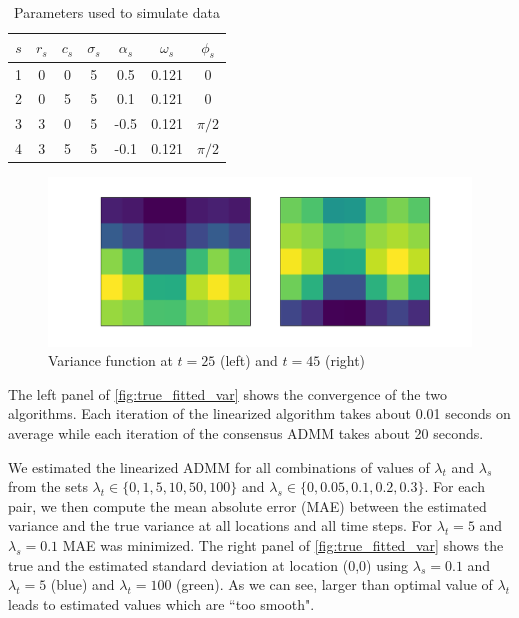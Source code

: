 \documentclass{article}
\begin{document}
\begin{table}[tb]
	\caption{Parameters used to simulate data}
	\label{tab:sim_params}
	\vskip 0.15in
	\begin{center}
		\begin{small}
			\begin{sc}
				\begin{tabular}{ccccccc}
					\hline

					$s$ & $r_s$ & $c_s$ & $\sigma_s$ &$\alpha_s$ & $\omega_s$ & $\phi_s$\\
					\hline
					1 & 0 & 0 & 5 & 0.5 & 0.121 & 0 \\
					2 & 0 & 5 & 5 & 0.1 & 0.121 & 0 \\
					3 & 3 & 0 & 5 & -0.5 & 0.121 & $\pi/2$ \\
					4 & 3 & 5 & 5 & -0.1 & 0.121 & $\pi/2$ \\
					\hline
				\end{tabular}
			\end{sc}
		\end{small}
	\end{center}
	\vskip -0.1in
\end{table} 

\begin{figure}[tb]
	\centering	
	\includegraphics[width=.7\linewidth]{Figures/true_var_spatial}		
	
	\caption{Variance function at $t=25$ (left) and $t=45$ (right)} \label{fig:true_var_spatial}
\end{figure}

The left panel of \autoref{fig:true_fitted_var} shows the convergence of the two algorithms. Each iteration of the linearized algorithm takes about 0.01 seconds on average while each iteration of the consensus ADMM takes about 20 seconds. 


We estimated the linearized ADMM for all combinations of values of $\lambda_t$ and $\lambda_s$ from the sets $\lambda_t \in \{0,1,5,10,50,100\}$ and $\lambda_s \in \{0,0.05,0.1,0.2,0.3\}$. For each pair, we then compute the mean absolute error (MAE) between the estimated variance and the true variance at all locations and all time steps. For $\lambda_t=5$ and $\lambda_s=0.1$ MAE was minimized. The right panel of \autoref{fig:true_fitted_var} shows the true and the estimated standard deviation at location (0,0) using $\lambda_s=0.1$ and $\lambda_t=5$ (blue) and $\lambda_t=100$ (green). As we can see, larger than optimal value of $\lambda_t$ leads to estimated values which are ``too smooth". 
\end{document}
